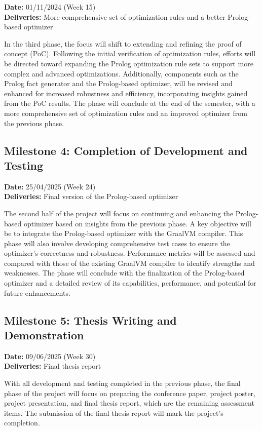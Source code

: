 \textbf{Date:} 01/11/2024 (Week 15) \\
\textbf{Deliveries:} More comprehensive set of optimization rules and a better Prolog-based optimizer

In the third phase, the focus will shift to extending and refining the proof of concept (PoC). Following the initial verification of optimization rules, efforts will be directed toward expanding the Prolog optimization rule sets to support more complex and advanced optimizations. Additionally, components such as the Prolog fact generator and the Prolog-based optimizer, will be revised and enhanced for increased robustness and efficiency, incorporating insights gained from the PoC results. The phase will conclude at the end of the semester, with a more comprehensive set of optimization rules and an improved optimizer from the previous phase.

\subsection{Milestone 4: Completion of Development and Testing}

\textbf{Date:} 25/04/2025 (Week 24) \\
\textbf{Deliveries:} Final version of the Prolog-based optimizer

The second half of the project will focus on continuing and enhancing the Prolog-based optimizer based on insights from the previous phase. A key objective will be to integrate the Prolog-based optimizer with the GraalVM compiler. This phase will also involve developing comprehensive test cases to ensure the optimizer’s correctness and robustness. Performance metrics will be assessed and compared with those of the existing GraalVM compiler to identify strengths and weaknesses. The phase will conclude with the finalization of the Prolog-based optimizer and a detailed review of its capabilities, performance, and potential for future enhancements.

\subsection{Milestone 5: Thesis Writing and Demonstration}
\textbf{Date:} 09/06/2025 (Week 30) \\
\textbf{Deliveries:} Final thesis report

With all development and testing completed in the previous phase, the final phase of the project will focus on preparing the conference paper, project poster, project presentation, and final thesis report, which are the remaining assessment items. The submission of the final thesis report will mark the project's completion.

